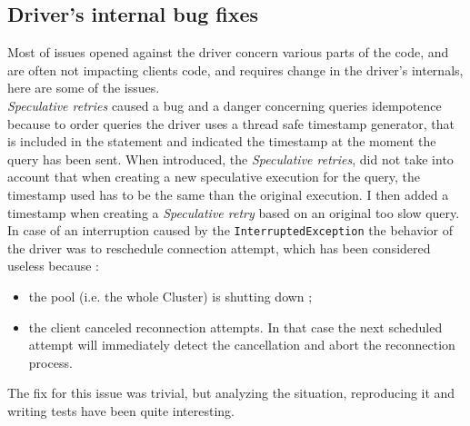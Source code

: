 \documentclass[a4paper]{report}
\begin{document}
\subsection{Driver's internal bug fixes}
Most of issues opened against the driver concern various parts of the code, and are often not impacting clients code, and requires change in the driver's internals, here are some of the  issues.\\
\emph{Speculative retries} caused a bug and a danger concerning queries idempotence because to order queries the driver uses a thread safe timestamp generator, that is included in the statement and indicated the timestamp at the moment the query has been sent. When introduced, the \emph{Speculative retries}, did not take into account that when creating a new speculative execution for the query, the timestamp used has to be the same than the original execution. I then added a timestamp when creating a \emph{Speculative retry} based on an original too slow query.\\
In case of an interruption caused by the \verb;InterruptedException; the behavior of the driver was to reschedule connection attempt, which has been considered useless because :
\begin{itemize}
   \item the pool (i.e. the whole Cluster) is shutting down ;
   \item the client canceled reconnection attempts. In that case the next scheduled attempt will immediately detect the cancellation and abort the reconnection process.
\end{itemize}
The fix for this issue was trivial, but analyzing the situation, reproducing it and writing tests have been quite interesting.
\end{document}
